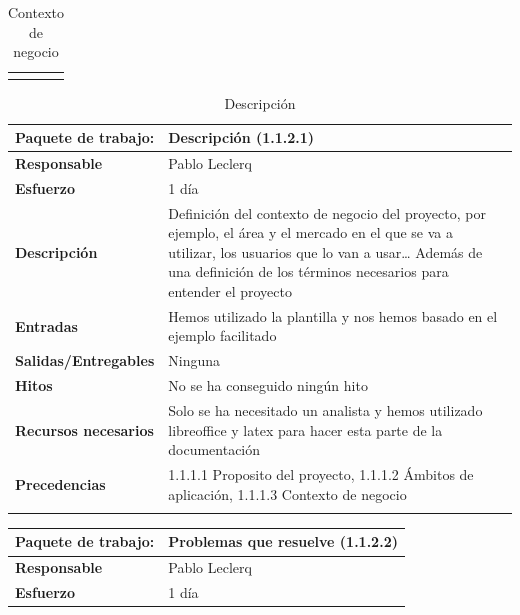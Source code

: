 \documentclass{report}
\begin{document}
\begin{center}
\begin{longtable}{|p{6cm}|p{6cm}|}
                    \hline
                    \caption{Contexto de negocio}
                \end{longtable}
                \begin{longtable}{|p{6cm}|p{6cm}|}
                    \hline
                    \textbf{Paquete de trabajo:} & Descripción (1.1.2.1)\\
                    \hline
                    \textbf{Responsable} & Pablo Leclerq\\
                    \hline
                    \textbf{Esfuerzo} & 1 día\\
                    \hline
                    \textbf{Descripción} & Definición del contexto de negocio del proyecto, por ejemplo, el área y el mercado en el que se va a utilizar, los usuarios que lo van a usar… Además de una definición de los términos necesarios para entender el proyecto \\
                    \hline
                    \textbf{Entradas} & Hemos utilizado la plantilla y nos hemos basado en el ejemplo facilitado\\
                    \hline
                    \textbf{Salidas/Entregables} & Ninguna\\
                    \hline
                    \textbf{Hitos} & No se ha conseguido ningún hito\\
                    \hline
                    \textbf{Recursos necesarios} & Solo se ha necesitado un analista y hemos utilizado libreoffice y latex para hacer esta parte de la documentación\\
                    \hline
                    \textbf{Precedencias} & 1.1.1.1 Proposito del proyecto,
                                            1.1.1.2 Ámbitos de aplicación,
                                            1.1.1.3 Contexto de negocio\\
                    \hline
                    \caption{Descripción}
                \end{longtable}
                \clearpage
                \begin{longtable}{|p{6cm}|p{6cm}|}
                    \hline
                    \textbf{Paquete de trabajo:} & Problemas que resuelve (1.1.2.2)\\
                    \hline
                    \textbf{Responsable} & Pablo Leclerq\\
                    \hline
                    \textbf{Esfuerzo} & 1 día\\
                    \hline

\end{longtable}
\end{center}
\end{document}

